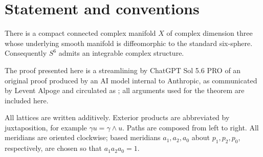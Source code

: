 \section{Statement and conventions}

\begin{theorem}\label{thm:main}
There is a compact connected complex manifold $X$ of complex dimension
three whose underlying smooth manifold is diffeomorphic to the standard
six-sphere.  Consequently $S^6$ admits an integrable complex structure.
\end{theorem}

The proof presented here is a streamlining by ChatGPT Sol 5.6 PRO of an
original proof produced by an AI model internal to Anthropic, as communicated
by Levent Alpoge and circulated as \cite{AnthropicProof}; all arguments used
for the theorem are included here.

All lattices are written additively.  Exterior products are abbreviated by
juxtaposition, for example $\gamma u=\gamma\wedge u$.  Paths are composed
from left to right.  All meridians are oriented clockwise; based meridians
$a_1,a_2,a_0$ about $p_1,p_2,p_0$, respectively, are chosen so that
$a_1a_2a_0=1$.

